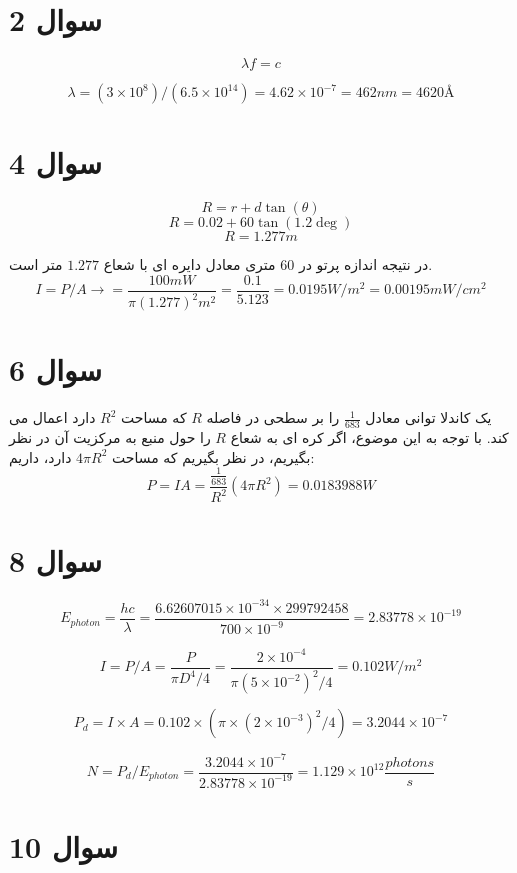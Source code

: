 \documentclass[12pt]{article}
\begin{document}
\KashidaOff


\section*{سوال 2}
$$\lambda f = c$$

$$\lambda = (3 \times 10^8) / (6.5 \times 10^{14}) = 4.62 \times 10^{-7} = 462 nm = 4620 \text{\AA}$$

\section*{سوال 4}

$$R = r + d \tan(\theta)$$
$$R = 0.02 + 60 \tan(1.2 \deg)$$
$$R = 1.277 m$$

در نتیجه اندازه پرتو در 60 متری معادل دایره ای با شعاع $1.277$ متر است.
$$I = P/A \rightarrow = \frac{100 mW} {\pi (1.277)^2 m^2} = \frac{0.1}{5.123} = 0.0195 W/m^2 = 0.00195 mW/cm^2$$

\section*{سوال 6}

یک کاندلا توانی معادل
 $\frac{1}{683}$
  را بر سطحی در فاصله $R$ که مساحت $R^2$ دارد اعمال می کند. با توجه به این موضوع، اگر کره ای به شعاع $R$ را حول منبع به مرکزیت آن در نظر بگیریم، در نظر بگیریم که مساحت
   $4\pi R^2$
دارد، داریم:
$$P = I A = \frac{\frac{1}{683}}{R^2}(4\pi R^2) = 0.0183988 W$$

\section*{سوال 8}

$$E_{photon} = \frac{hc}{\lambda} = \frac{6.62607015\times10^{-34} \times 299792458}{700 \times 10^{-9}} = 2.83778\times10^{-19}$$

$$I = P/A = \frac{P}{\pi D^4/4} = \frac{2\times 10^{-4}}{\pi (5\times 10^{-2})^2/4} = 0.102 W/m^2$$

$$P_d = I \times A = 0.102 \times (\pi \times (2\times 10^{-3})^2/4) =3.2044 \times 10^{-7}$$

$$N  = P_d / E_{photon} = \frac{3.2044 \times 10^{-7}}{2.83778\times10^{-19}} = 1.129 \times 10^{12} \frac{{photons}}{s} $$


\section*{سوال 10}
\end{document}
